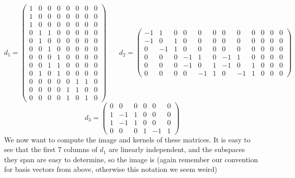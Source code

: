 \[ d_1 = \left(
					 \begin{array}{cccccccc}
					   1 & 0 & 0 & 0 & 0 & 0 & 0 & 0 \\
					   1 & 0 & 0 & 0 & 0 & 0 & 0 & 0 \\
					   1 & 0 & 0 & 0 & 0 & 0 & 0 & 0 \\
					   0 & 1 & 1 & 0 & 0 & 0 & 0 & 0 \\
					   0 & 1 & 0 & 0 & 0 & 0 & 0 & 0 \\
					   0 & 0 & 1 & 0 & 0 & 0 & 0 & 0 \\
					   0 & 0 & 0 & 1 & 0 & 0 & 0 & 0 \\
					   0 & 0 & 1 & 1 & 0 & 0 & 0 & 0 \\
					   0 & 1 & 0 & 1 & 0 & 0 & 0 & 0 \\
					   0 & 0 & 0 & 0 & 0 & 1 & 1 & 0 \\
					   0 & 0 & 0 & 0 & 1 & 1 & 0 & 0 \\
					   0 & 0 & 0 & 0 & 1 & 0 & 1 & 0 
					 \end{array}
				 \right)
\ \ \ \ \ \ \ \ 
d_2 = \left(
        \begin{array}{cccccccccccc}
        	-1 &  1 & 0 &  0 &  0 & 0 &  0 &  0 & 0 & 0 & 0 & 0 \\
        	-1 &  0 & 1 &  0 &  0 & 0 &  0 &  0 & 0 & 0 & 0 & 0 \\
        	 0 & -1 & 1 &  0 &  0 & 0 &  0 &  0 & 0 & 0 & 0 & 0 \\
        	 0 &  0 & 0 & -1 &  1 & 0 & -1 &  1 & 0 & 0 & 0 & 0 \\
        	 0 &  0 & 0 & -1 &  0 & 1 & -1 &  0 & 1 & 0 & 0 & 0 \\
        	 0 &  0 & 0 &  0 & -1 & 1 &  0 & -1 & 1 & 0 & 0 & 0 
        \end{array}
      \right)
\]
\[
d_3 = \left(
        \begin{array}{cccccc}
          0 &  0 & 0 & 0 &  0 & 0 \\
          1 & -1 & 1 & 0 &  0 & 0 \\
          1 & -1 & 1 & 0 &  0 & 0 \\
          0 &  0 & 0 & 1 & -1 & 1 
        \end{array}
      \right)
\]
We now want to compute the image and kernels of these matrices. It is easy to see that the first 7 columns of $d_1$ are linearly independent, and the subspaces they span are easy to determine, so the image is (again remember our convention for basis vectors from above, otherwise this notation we seem weird)
